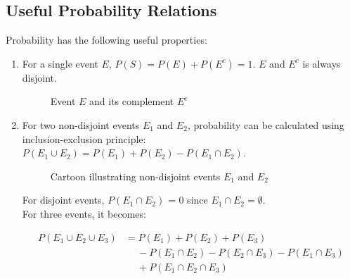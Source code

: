 \documentclass[12pt, a4paper]{article}
\begin{document}
\subsection{Useful Probability Relations}

Probability has the following useful properties:

\begin{enumerate}[i]
  \item For a single event $E$, $P(S)=P(E)+P(E^c)=1$. $E$ and $E^c$ is always disjoint.
\begin{figure}[H]
\centering
{}
\caption{Event $E$ and its complement $E^c$}
\end{figure}
  \item For two non-disjoint events $E_1$ and $E_2$, probability can be calculated using inclusion-exclusion principle: $P(E_1 \cup E_2) = P(E_1) + P(E_2) - P(E_1 \cap E_2)$.
\def\firstcircle{(0,0) circle (1.8cm)}
\def\secondcircle{(0:2cm) circle (1.8cm)}
\begin{figure}[H]
\centering
{}
\caption{Cartoon illustrating non-disjoint events $E_1$ and $E_2$}
\end{figure}
For disjoint events, $P(E_1 \cap E_2)$ = 0 since $E_1 \cap E_2 = \emptyset$. \\

For three events, it becomes:

\begin{align*}
P(E_1 \cup E_2 \cup E_3) &= P(E_1) + P(E_2) + P(E_3) \\
&\phantom{-} - P(E_1 \cap E_2) - P(E_2 \cap E_3) - P(E_1 \cap E_3) \\
&\phantom{-} + P(E_1 \cap E_2 \cap E_3)
\end{align*}


\end{enumerate}
\end{document}
